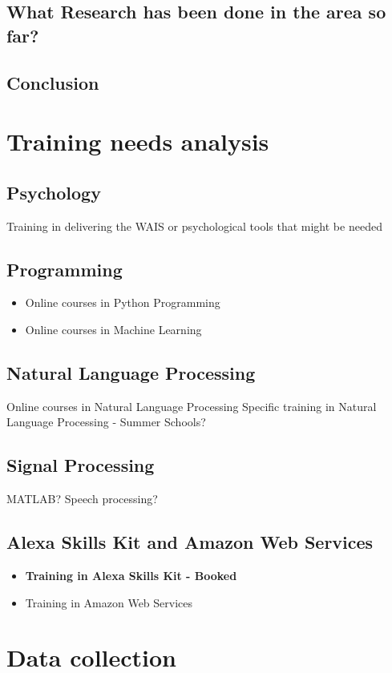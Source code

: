 \documentclass{article}
\begin{document}
	\subsection{What Research has been done in the area so far?}
	\subsection{Conclusion}
	
	\section{Training needs analysis}
	\subsection{Psychology}
	Training in delivering the WAIS or psychological tools that might be needed 
	\subsection{Programming}
	\begin{itemize}
		\item Online courses in Python Programming
		\item Online courses in Machine Learning
	\end{itemize}

	\subsection{Natural Language Processing}
	Online courses in Natural Language Processing
	Specific training in Natural Language Processing - Summer Schools?
	
	\subsection{Signal Processing}
	MATLAB? Speech processing?
	
	\subsection{Alexa Skills Kit and Amazon Web Services}
	\begin{itemize}
		\item \textbf{Training in Alexa Skills Kit - Booked}
		\item Training in Amazon Web Services
	\end{itemize}

	\section{Data collection}
\end{document}
